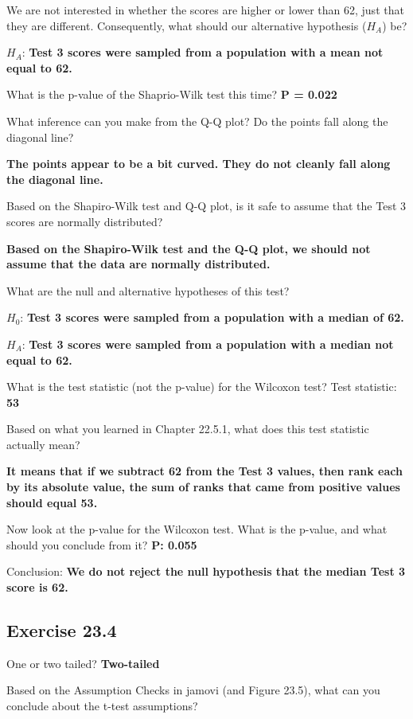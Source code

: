 \documentclass[
  openany]{scrbook}
\begin{document}
We are not interested in whether the scores are higher or lower than 62, just that
they are different. Consequently, what should our alternative hypothesis (\(H_{A}\)) be?

\(H_{A}\): \textbf{Test 3 scores were sampled from a population with a mean not equal to 62.}

What is the p-value of the Shaprio-Wilk test this time? \textbf{P = 0.022}

What inference can you make from the Q-Q plot? Do the points fall along the diagonal line?

\textbf{The points appear to be a bit curved. They do not cleanly fall along the diagonal line.}

Based on the Shapiro-Wilk test and Q-Q plot, is it safe to assume that the Test 3 scores are normally distributed?

\textbf{Based on the Shapiro-Wilk test and the Q-Q plot, we should not assume that the data are normally distributed.}

What are the null and alternative hypotheses of this test?

\(H_{0}\): \textbf{Test 3 scores were sampled from a population with a median of 62.}

\(H_{A}\): \textbf{Test 3 scores were sampled from a population with a median not equal to 62.}

What is the test statistic (not the p-value) for the Wilcoxon test? Test statistic: \textbf{53}

Based on what you learned in Chapter 22.5.1, what does this test statistic actually mean?

\textbf{It means that if we subtract 62 from the Test 3 values, then rank each by its absolute value, the sum of ranks that came from positive values should equal 53.}

Now look at the p-value for the Wilcoxon test. What is the p-value, and what
should you conclude from it? \textbf{P: 0.055}

Conclusion: \textbf{We do not reject the null hypothesis that the median Test 3 score is 62.}

\hypertarget{exercise-23.4}{%
\subsection{Exercise 23.4}\label{exercise-23.4}}

One or two tailed? \textbf{Two-tailed}

Based on the Assumption Checks in jamovi (and Figure 23.5), what can you conclude about the t-test assumptions?
\end{document}
